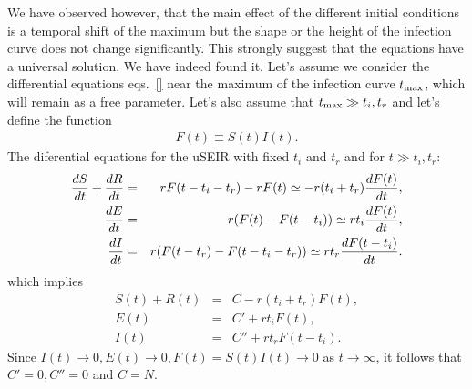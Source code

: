 \documentclass[a4paper,oneside,11pt]{article}
\begin{document}
 We have observed however, that the main effect of the different initial conditions is a temporal shift of the maximum but the shape or the height of the infection curve does not change significantly. This strongly suggest that the equations have a universal solution. We have indeed found it. Let's assume we consider the differential equations eqs.~\ref{} near the maximum of the infection curve $t_{\rm max}$, which will remain as a free parameter. Let's also assume that $t_{\rm max} \gg t_i, t_r$ and let's define the function
 \begin{eqnarray}
 F(t) \equiv S(t) I(t).
 \end{eqnarray} 
 The diferential equations for the uSEIR with fixed $t_i$ and $t_r$ and for $t\gg t_i, t_r$:
 \begin{eqnarray}
 {d S \over dt}+{d R\over dt} &=& r F(t-t_i - t_r) - r F(t) \simeq -r (t_i+t_r) {dF(t)\over dt}, \nonumber\\
  {d E \over dt} &=& r (F(t) - F(t-t_i))  \simeq r t_i {d F(t) \over dt}, \nonumber\\
   {d I \over dt} &=& r (F(t-t_r) - F(t-t_i-t_r))  \simeq r t_r {d F(t-t_i) \over dt}.
 \end{eqnarray}
 which implies
 \begin{eqnarray}
 S(t)+R(t) &=& C - r (t_i + t_r) F(t), \nonumber\\
   E(t) &=& C' +r t_iF(t), \nonumber\\
   I(t) &=& C'' +r t_r F(t-t_i). \;\;
 \end{eqnarray}
 Since $I(t) \rightarrow 0, E(t)\rightarrow 0, F(t) = S(t) I(t) \rightarrow 0$ as $t\rightarrow \infty$, it follows that $C'=0, C''=0$ and $C= N$. 
 
\end{document}
